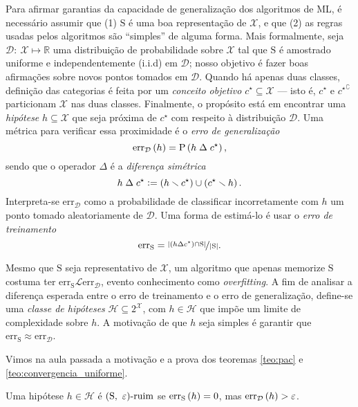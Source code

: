 Para afirmar garantias da capacidade de generalização dos algoritmos de ML, é necessário assumir que (1) $\mathrm{S}$ é uma boa representação de $\mathcal{X}$, e que (2) as regras usadas pelos algoritmos são ``simples'' de alguma forma. Mais formalmente, seja $\mathcal{D}\colon\ \mathcal{X}\mapsto\mathds{R}$ uma distribuição de probabilidade sobre $\mathcal{X}$ tal que $\mathrm{S}$ é amostrado uniforme e independentemente (i.i.d) em $\mathcal{D}$; nosso objetivo é fazer boas afirmações sobre novos pontos tomados em $\mathcal{D}$. Quando há apenas duas classes, definição das categorias é feita por um \textit{conceito objetivo} $c^\star\subseteq\mathcal{X}$ --- isto é, $c^\star$ e ${c^\star}^\complement$ particionam $\mathcal{X}$ nas duas classes. Finalmente, o propósito está em encontrar uma \textit{hipótese} $h\subseteq\mathcal{X}$ que seja próxima de $c^\star$ com respeito à distribuição $\mathcal{D}$. Uma métrica para verificar essa proximidade é o \textit{erro de generalização}
\[
  \mathrm{err}_\mathcal{D}\left(h\vphantom{1j}\right)=\mathrm{P}\left(h\mathrel{\Delta}c^\star\vphantom{1j}\right),
\]
sendo que o operador $\Delta$ é a \textit{diferença simétrica}
\[
  h\mathrel{\Delta}c^\star\vcentcolon=\left(h\setminus c^\star\vphantom{1j}\right)\cup\left(c^\star\setminus h\vphantom{1j}\right).
\]
Interpreta-se $\mathrm{err}_\mathcal{D}$ como a probabilidade de classificar incorretamente com $h$ um ponto tomado aleatoriamente de $\mathcal{D}$. Uma forma de estimá-lo é usar o \textit{erro de treinamento}
\[
  \mathrm{err}_\mathrm{S}=\nicefrac{\left|\left(h\mathrel{\Delta}c^\star\vphantom{1j}\right)\cap\mathrm{S}\vphantom{1j}\right|}{\left|\mathrm{S}\vphantom{1j}\right|}.
\]

Mesmo que $\mathrm{S}$ seja representativo de $\mathcal{X}$, um algoritmo que apenas memorize $\mathrm{S}$ costuma ter $\mathrm{err}_\mathrm{S}\mathcal{L}\mathrm{err}_\mathcal{D}$, evento conhecimento como \textit{overfitting}. A fim de analisar a diferença esperada entre o erro de treinamento e o erro de generalização, define-se uma \textit{classe de hipóteses} $\mathcal{H}\subseteq 2^\mathcal{X}$, com $h\in\mathcal{H}$ que impõe um limite de complexidade sobre $h$. A motivação de que $h$ seja simples é garantir que $\mathrm{err}_\mathrm{S}\approx\mathrm{err}_\mathcal{D}$.

Vimos na aula passada a motivação e a prova dos teoremas \autoref{teo:pac} e \autoref{teo:convergencia_uniforme}.

\begin{definicao}
  Uma hipótese $h\in\mathcal{H}$ é $\left(\mathrm{S},\ \eps\vphantom{1j}\right)\!\text{-ruim}$ se $\mathrm{err}_\mathrm{S}\left(h\vphantom{1j}\right)=0$, mas $\mathrm{err}_\mathcal{D}\left(h\vphantom{1j}\right)>\eps$.
\end{definicao}

